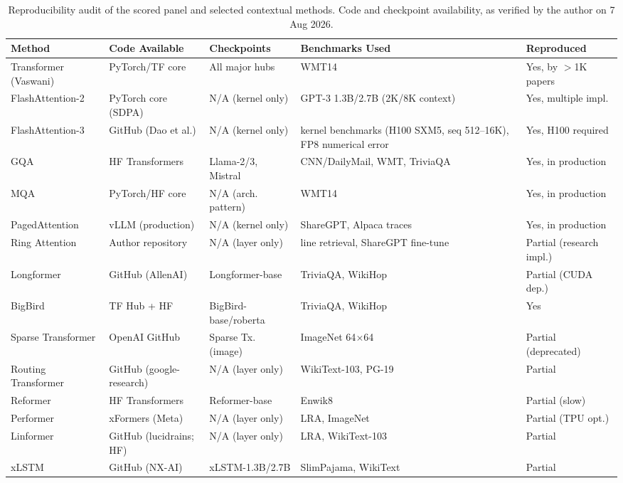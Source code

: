 \documentclass[10pt,twocolumn]{article}
\newif\ifshrinkfloats
\newcommand{\sflt}[2]{\ifshrinkfloats#1\else#2\fi}
\begin{document}
\begin{table}[!tbp]
\centering
\sflt{\scriptsize}{\footnotesize}
\renewcommand{\arraystretch}{\sflt{0.95}{1.05}}
\caption{Reproducibility audit of the scored panel and selected contextual methods. Code and checkpoint availability, as verified by the author on 7 Aug 2026.}
\label{tab:reproducibility}
\begin{tabular}{p{1.8cm}p{2.0cm}p{2.0cm}p{2.2cm}p{1.6cm}}
\toprule
Method & Code Available & Checkpoints & Benchmarks Used & Reproduced \\
\midrule
Transformer (Vaswani) & PyTorch/TF core & All major hubs & WMT14 & Yes, by $>$1K papers \\
FlashAttention-2 & PyTorch core (SDPA) & N/A (kernel only) & GPT-3 1.3B/2.7B (2K/8K context) & Yes, multiple impl. \\
FlashAttention-3 & GitHub (Dao et al.) & N/A (kernel only) & kernel benchmarks (H100 SXM5, seq 512--16K), FP8 numerical error & Yes, H100 required \\
GQA & HF Transformers & Llama-2/3, Mistral & CNN/DailyMail, WMT, TriviaQA & Yes, in production \\
MQA & PyTorch/HF core & N/A (arch. pattern) & WMT14 & Yes, in production \\
PagedAttention & vLLM (production) & N/A (kernel only) & ShareGPT, Alpaca traces & Yes, in production \\
Ring Attention & Author repository & N/A (layer only) & line retrieval, ShareGPT fine-tune & Partial (research impl.) \\
Longformer & GitHub (AllenAI) & Longformer-base & TriviaQA, WikiHop & Partial (CUDA dep.) \\
BigBird & TF Hub + HF & BigBird-base/roberta & TriviaQA, WikiHop & Yes \\
Sparse Transformer & OpenAI GitHub & Sparse Tx. (image) & ImageNet 64$\times$64 & Partial (deprecated) \\
Routing Transformer & GitHub (google-research) & N/A (layer only) & WikiText-103, PG-19 & Partial \\
Reformer & HF Transformers & Reformer-base & Enwik8 & Partial (slow) \\
Performer & xFormers (Meta) & N/A (layer only) & LRA, ImageNet & Partial (TPU opt.) \\
Linformer & GitHub (lucidrains; HF) & N/A (layer only) & LRA, WikiText-103 & Partial \\
xLSTM & GitHub (NX-AI) & xLSTM-1.3B/2.7B & SlimPajama, WikiText & Partial \\

\end{tabular}
\end{table}
\end{document}
